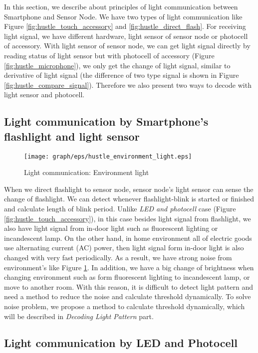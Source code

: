 In this section, we describe about principles of light communication between Smartphone and Sensor Node. We have two types of light communication like Figure \ref{fig:hustle_touch_accessory} and \ref{fig:hustle_direct_flash}. For receiving light signal, we have different hardware, light sensor of sensor node or photocell of accessory. With light sensor of sensor node, we can get light signal directly by reading status of light sensor but with photocell of accessory (Figure \ref{fig:hustle_microphone}), we only get the change of light signal, similar to derivative of light signal (the difference of two type signal is shown in Figure \ref{fig:hustle_compare_signal}). Therefore we also present two ways to decode with light sensor and photocell.

\subsection{Light communication by Smartphone's flashlight and light sensor}

\begin{figure}[tb]
\centering
\texttt{[image: graph/eps/hustle\_environment\_light.eps]}
\caption{Light communication: Environment light}
\label{fig:hustle_environment_light}
\end{figure}

When we direct flashlight to sensor node, sensor node's light sensor can sense the change of flashlight. We can detect whenever flashlight-blink is started or finished and calculate length of blink period. Unlike \emph{LED and photocell} case (Figure \ref{fig:hustle_touch_accessory}), in this case besides light signal from flashlight, we also have light signal from in-door light such as fluorescent lighting or incandescent lamp. On the other hand, in home environment all of electric goods use alternating current (AC) power, then light signal form in-door light is also changed with very fast periodically. As a result, we have strong noise from environment's like Figure \ref{fig:hustle_environment_light}. In addition, we have a big change of brightness when changing environment such as form fluorescent lighting to incandescent lamp, or move to another room. With this reason, it is difficult to detect light pattern and need a method to reduce the noise and calculate threshold dynamically. To solve noise problem, we propose a method to calculate threshold dynamically, which will be described in \emph{Decoding Light Pattern} part.

\subsection{Light communication by LED and Photocell}

